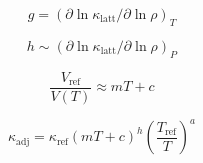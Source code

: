 $$g=\left( \partial \ln \kappa_{\mathrm{latt}} / \partial \ln \rho \right) _{T}$$

$$h \sim \left( \partial \ln \kappa_{\mathrm{latt}} / \partial \ln \rho \right) _{P}$$

$$\frac{V_{\mathrm{ref}}}{V(T)} \approx  mT+c$$

$$\kappa_{\mathrm{adj}}=\kappa_{\mathrm{ref}} \left ( mT+c \right )^{h} \left ( \frac{T_{\mathrm{ref}}}{T} \right )^{a}$$













\pagebreak



